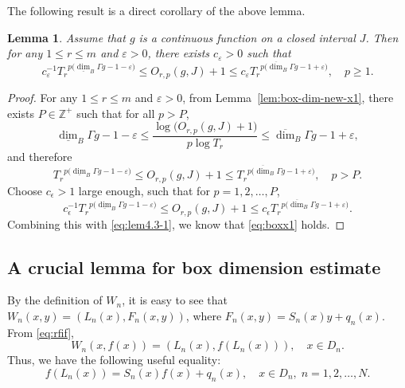 \documentclass[11pt]{amsart}
\newtheorem{lem}[thm]{Lemma}
\theoremstyle{definition}
\theoremstyle{remark}
\numberwithin{equation}{section}
\newcommand{\bZp}{{{\mathbb Z}^+}}
\newcommand{\green}{\color{green}}
\newcommand{\blue}{\color{blue}}
\newcommand{\Var}{\mathrm{Var}}
\def\vep{\varepsilon}
\def\updimB{\overline{\dim}_B}
\def\lowdimB{\underline{\dim}_B}
\begin{document}
The following result is a direct corollary of the above lemma.
\begin{lem}\label{lem:osci-box-dim}
	Assume that $g$ is a continuous function on a closed interval $J$.
	Then for any $1\leq r\leq m$ and $\vep>0$, there exists $c_{\vep}>0$ such that 
	\begin{equation}\label{eq:boxx1}
		c_{\vep}^{-1} {T_r}^{p \big( \lowdimB \Gamma g -1-\vep\big)}
		\leq O_{r,p}(g,J) +1
		\leq c_{\vep} {T_r}^{p \big(  \updimB \Gamma g -1+\vep\big)}, \quad  p \geq 1.
	\end{equation} 
\end{lem}
\begin{proof}	
	For any $1\leq r\leq m$ and $\vep>0$, from Lemma~\ref{lem:box-dim-new-x1}, there exists $P\in \bZp$ such that for all $p>P$,
	$$
	\lowdimB \Gamma g -1-\vep \leq \frac{\log \big(O_{r,p}(g,J)+1\big)}{p\log T_r} \leq \updimB \Gamma g -1+\vep,
	$$
	and therefore
	\begin{equation}\label{eq:lem4.3-1}
	    {T_r}^{p \big( \lowdimB \Gamma g -1-\vep\big)} \leq O_{r,p}(g,J)+1  \leq {T_r}^{p \big( \updimB \Gamma g -1+\vep\big)}, \quad p>P.		
	\end{equation}
	Choose $c_\epsilon>1$ large enough, such that for $p=1,2,\ldots,P$,
	\[
	c_\epsilon^{-1} {T_r}^{p \big( \lowdimB \Gamma g -1-\vep\big)}
	\leq O_{r,p}(g,J) +1
	\leq c_\epsilon {T_r}^{p \big(  \updimB \Gamma g -1+\vep\big)}.
	\]
	Combining this with \eqref{eq:lem4.3-1}, we know that \eqref{eq:boxx1} holds.
\end{proof}






\subsection{A crucial lemma for box dimension estimate}


By the definition of $W_n$, it is easy to see that $W_n(x,y)=(L_n(x),F_n(x,y))$, where
$F_n(x,y)=S_n(x)y+q_n(x)$.
From \eqref{eq:rfif}, 
\[
   W_n(x,f(x))=(L_n(x),f(L_n(x))), \quad x\in D_n. 
\]
Thus, we have the following useful equality:
\begin{equation}\label{eq:RFIF-Rec-Expression}
	f(L_n(x))=S_n(x)f(x)+q_n(x), \quad x\in D_n, \; n=1,2,\ldots,N.
\end{equation}
\end{document}
